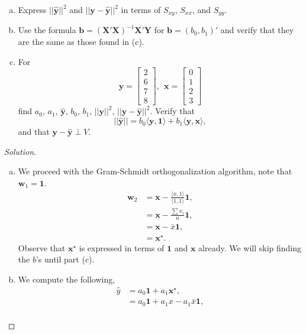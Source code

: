\documentclass{amsart}
\begin{document}
\begin{enumerate}
\begin{enumerate}[(a)]
				\item Express $||\mathbf{\hat{y}}||^{2}$ and $||\mathbf{y} - \mathbf{\hat{y}}||^{2}$ in terms of $S_{xy}$, $S_{xx}$, and $S_{yy}$.
				\item Use the formula $\mathbf{b} = (\mathbf{X}'\mathbf{X})^{-1}\mathbf{X}'\mathbf{Y}$ for $\mathbf{b} = (b_{0}, b_{1})'$ and verify that they are the same as those found in (c).
				\item For $$\mathbf{y} = \begin{bmatrix}
					2 \\
					6 \\
					7 \\
					8
				\end{bmatrix}, \ \ 
				\mathbf{x} = \begin{bmatrix}
					0 \\
					1 \\
					2 \\
					3 
				\end{bmatrix}$$ find $a_{0}$, $a_{1}$, $\mathbf{\hat{y}}$, $b_{0}$, $b_{1}$, $||\mathbf{y}||^{2}$, $||\mathbf{y} - \mathbf{\hat{y}}||^{2}$. Verify that $$||\mathbf{\hat{y}}|| = b_{0}\langle \mathbf{y}, \mathbf{1} \rangle + b_{1} \langle \mathbf{y}, \mathbf{x}\rangle,$$ and that $\mathbf{y} - \mathbf{\hat{y}} \perp V$.
			\end{enumerate}
		\begin{proof}[Solution] \
			\begin{enumerate}[(a)]
				\item We proceed with the Gram-Schmidt orthogonalization algorithm, note that $\mathbf{w}_{1} = \mathbf{1}$.
					\begin{align*}
						\mathbf{w}_{2} &= \mathbf{x} - \frac{\langle x, 1 \rangle}{\langle 1, 1 \rangle}\mathbf{1}, \\
						&= \mathbf{x} - \frac{\sum x_{i}}{n}\mathbf{1}, \\
						&= \mathbf{x} - \bar{x}\mathbf{1}, \\
						&= \mathbf{x}^{\star}.
					\end{align*}
				Observe that $\mathbf{x}^{\star}$ is expressed in terms of $\mathbf{1}$ and $\mathbf{x}$ already. We will skip finding the $b$'s until part (c).
				\item We compute the following,
					\begin{align*}
						\hat{y} &= a_{0}\mathbf{1} + a_{1}\mathbf{x}^{\star}, \\
						&= a_{0}\mathbf{1} + a_{1}x - a_{1}\bar{x}\mathbf{1}, \\

\end{align*}
\end{enumerate}
\end{proof}
\end{enumerate}
\end{document}
